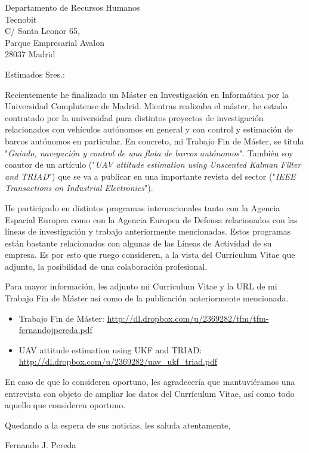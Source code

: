 \documentclass{letter}
\begin{document}
    \begin{letter}{Departamento de Recursos Humanos\\Tecnobit\\C/ Santa Leonor 65,\\Parque
            Empresarial Avalon\\28037 Madrid}

        \opening{Estimados Sres.:}

        Recientemente he finalizado un Máster en Investigación en Informática por la Universidad
        Complutense de Madrid. Mientras realizaba el máster, he estado contratado por la universidad
        para distintos proyectos de investigación relacionados con vehículos autónomos en general y
        con control y estimación de barcos autónomos en particular. En concreto, mi Trabajo Fin de
        Máster, se titula "\emph{Guiado, navegación y control de una flota de barcos autónomos}".
        También soy coautor de un artículo ("\emph{UAV attitude estimation using Unscented Kalman
        Filter and TRIAD}") que se va a publicar en una importante revista del sector
        ("\emph{IEEE Transactions on Industrial Electronics}").

        He participado en distintos programas internacionales tanto con la Agencia Espacial Europea
        como con la Agencia Europea de Defensa relacionados con las líneas de investigación y
        trabajo anteriormente mencionadas. Estos programas están bastante relacionados con algunas
        de las Líneas de Actividad de su empresa. Es por esto que ruego consideren, a la vista del
        Currículum Vitae que adjunto, la posibilidad de una colaboración profesional.

        Para mayor información, les adjunto mi Curriculum Vitae y la URL de mi Trabajo Fin de Máster
        así como de la publicación anteriormente mencionada.

        \begin{itemize}
            \item Trabajo Fin de Máster:
                \url{http://dl.dropbox.com/u/2369282/tfm/tfm-fernandojpereda.pdf}
            \item UAV attitude estimation using UKF and TRIAD:
                \url{http://dl.dropbox.com/u/2369282/uav_ukf_triad.pdf}
        \end{itemize}

        En caso de que lo consideren oportuno, les agradecería que mantuviéramos una entrevista con
        objeto de ampliar los datos del Currículum Vitae, así como todo aquello que consideren
        oportuno.

        Quedando a la espera de sus noticias, les saluda atentamente,
        \closing{Fernando J. Pereda}
    \end{letter}
\end{document}
